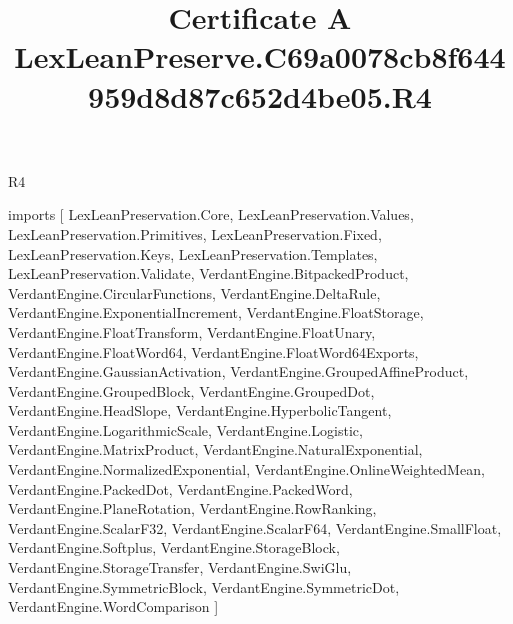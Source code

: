 \begin{lexlean}{R4}
\title{Certificate A LexLeanPreserve.C69a0078cb8f644959d8d87c652d4be05.R4}
\begin{coremodule}
imports [
  LexLeanPreservation.Core,
  LexLeanPreservation.Values,
  LexLeanPreservation.Primitives,
  LexLeanPreservation.Fixed,
  LexLeanPreservation.Keys,
  LexLeanPreservation.Templates,
  LexLeanPreservation.Validate,
  VerdantEngine.BitpackedProduct,
  VerdantEngine.CircularFunctions,
  VerdantEngine.DeltaRule,
  VerdantEngine.ExponentialIncrement,
  VerdantEngine.FloatStorage,
  VerdantEngine.FloatTransform,
  VerdantEngine.FloatUnary,
  VerdantEngine.FloatWord64,
  VerdantEngine.FloatWord64Exports,
  VerdantEngine.GaussianActivation,
  VerdantEngine.GroupedAffineProduct,
  VerdantEngine.GroupedBlock,
  VerdantEngine.GroupedDot,
  VerdantEngine.HeadSlope,
  VerdantEngine.HyperbolicTangent,
  VerdantEngine.LogarithmicScale,
  VerdantEngine.Logistic,
  VerdantEngine.MatrixProduct,
  VerdantEngine.NaturalExponential,
  VerdantEngine.NormalizedExponential,
  VerdantEngine.OnlineWeightedMean,
  VerdantEngine.PackedDot,
  VerdantEngine.PackedWord,
  VerdantEngine.PlaneRotation,
  VerdantEngine.RowRanking,
  VerdantEngine.ScalarF32,
  VerdantEngine.ScalarF64,
  VerdantEngine.SmallFloat,
  VerdantEngine.Softplus,
  VerdantEngine.StorageBlock,
  VerdantEngine.StorageTransfer,
  VerdantEngine.SwiGlu,
  VerdantEngine.SymmetricBlock,
  VerdantEngine.SymmetricDot,
  VerdantEngine.WordComparison
]


\end{coremodule}
\end{lexlean}
